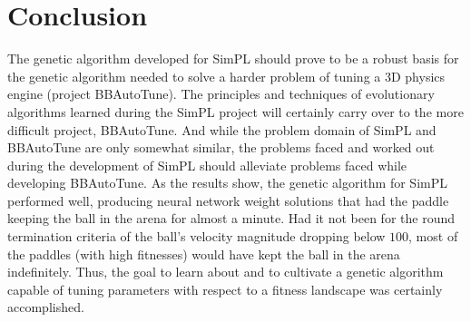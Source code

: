 
\section{Conclusion}


The genetic algorithm developed for SimPL should prove to be a robust basis for the genetic algorithm needed to solve a harder problem of tuning a 3D physics engine (project BBAutoTune). The principles and techniques of evolutionary algorithms learned during the SimPL project will certainly carry over to the more difficult project, BBAutoTune. And while the problem domain of SimPL and BBAutoTune are only somewhat similar, the problems faced and worked out during the development of SimPL should alleviate problems faced while developing BBAutoTune. As the results show, the genetic algorithm for SimPL performed well, producing neural network weight solutions that had the paddle keeping the ball in the arena for almost a minute. Had it not been for the round termination criteria of the ball's velocity magnitude dropping below $100$, most of the paddles (with high fitnesses) would have kept the ball in the arena indefinitely. Thus, the goal to learn about and to cultivate a genetic algorithm capable of tuning parameters with respect to a fitness landscape was certainly accomplished. 